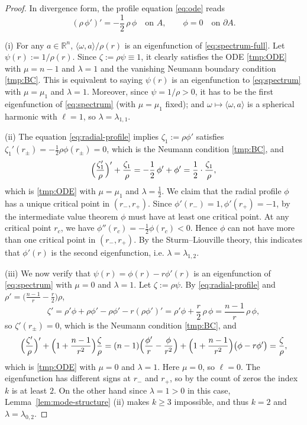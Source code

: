 \documentclass[11pt]{article}
\numberwithin{equation}{section}
\theoremstyle{definition}
\newcommand{\RR}{\mathbb{R}}
\begin{document}
\begin{proof}
In divergence form, the profile equation \eqref{eq:ode} reads
\begin{equation}
\label{eq:radial-profile}
    (\rho\,\phi')'=-\frac12\,\rho\,\phi
    \quad\text{on }A,
    \qquad
    \phi=0
    \quad\text{on }\partial A.
\end{equation}

(i) For any $a\in \RR^n$, $\langle \omega,a \rangle /\rho(r)$ is an eigenfunction of \eqref{eq:spectrum-full}. Let $\psi(r) := 1/\rho(r)$. Since $\zeta:= \rho\psi \equiv 1$, it clearly satisfies the ODE \eqref{tmp:ODE} with $\mu=n-1$ and $\lambda = 1$ and the vanishing Neumann boundary condition \eqref{tmp:BC}. This is equivalent to saying $\psi(r)$ is an eigenfunction to \eqref{eq:spectrum} with $\mu=\mu_1$ and $\lambda=1$.
Moreover, since $\psi=1/\rho>0$, it has to be the first eigenfunction of \eqref{eq:spectrum} (with $\mu=\mu_1$ fixed); and $\omega \mapsto \langle \omega, a\rangle$ is a spherical harmonic with $\ell=1$, so $\lambda = \lambda_{1,1}$.

(ii) The equation \eqref{eq:radial-profile} implies $\zeta_1:=\rho\phi'$ satisfies $\zeta_1'(r_\pm)=-\frac12\rho\phi(r_\pm)=0$, which is the Neumann condition \eqref{tmp:BC}, and
\[
    \Bigl(\frac{\zeta_1'}{\rho}\Bigr)'+\frac{\zeta_1}{\rho}
    =-\frac12\,\phi'+\phi'
    =\frac12\cdot\frac{\zeta_1}{\rho},
\]
which is \eqref{tmp:ODE} with $\mu=\mu_1$ and $\lambda=\frac12$.
We claim that the radial profile $\phi$ has a unique critical point in $(r_-,r_+)$. Since $\phi'(r_-) = 1, \phi'(r_+) = -1$, by the intermediate value theorem $\phi$ must have at least one critical point. At any critical point $r_c$, we have $\phi''(r_c) = -\frac12 \phi(r_c) < 0$. Hence $\phi$ can not have more than one critical point in $(r_-,r_+)$. By the Sturm--Liouville theory, this indicates that $\phi'(r)$ is the second eigenfunction, i.e. $\lambda = \lambda_{1,2}$.

(iii) We now verify that $\psi(r) = \phi(r) - r \phi '(r)$
is an eigenfunction of \eqref{eq:spectrum}
with $\mu = 0$ and $\lambda = 1$. Let $\zeta:=\rho\psi$. By \eqref{eq:radial-profile} and $\rho'=\bigl(\tfrac{n-1}{r}-\tfrac{r}{2}\bigr)\rho$,
\[
    \zeta'
    =\rho'\phi+\rho\phi'-\rho\phi'-r(\rho\phi')'
    =\rho'\phi+\frac{r}{2}\,\rho\,\phi
    =\frac{n-1}{r}\,\rho\,\phi,
\]
so $\zeta'(r_\pm)=0$, which is the Neumann condition \eqref{tmp:BC}, and
\[
    \Bigl(\frac{\zeta'}{\rho}\Bigr)'+\Bigl(1+\frac{n-1}{r^2}\Bigr)\frac{\zeta}{\rho}
    =(n-1)\Bigl(\frac{\phi'}{r}-\frac{\phi}{r^2}\Bigr)+\Bigl(1+\frac{n-1}{r^2}\Bigr)\bigl(\phi-r\phi'\bigr)
    =\frac{\zeta}{\rho},
\]
which is \eqref{tmp:ODE} with $\mu=0$ and $\lambda=1$.
Here $\mu=0$, so $\ell=0$. The eigenfunction has different signs at $r_-$ and $r_+$, so by the count of zeros the index $k$ is at least $2$. On the other hand since $\lambda = 1>0$ in this case, Lemma~\ref{lem:mode-structure} (ii) makes $k\geq 3$ impossible, and thus $k=2$ and $\lambda=\lambda_{0,2}$.
\end{proof}
\end{document}
